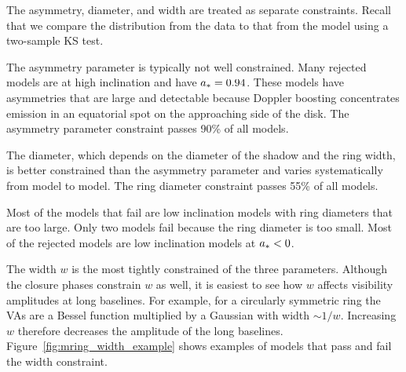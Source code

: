 The \mring asymmetry, diameter, and width are treated as separate constraints.
Recall that we compare the distribution from the data to that from the model using a two-sample KS test.

The asymmetry parameter is typically not well constrained.
Many rejected models are at high inclination and have $a_* =0.94$.
These models have asymmetries that are large and detectable because Doppler boosting concentrates emission in an equatorial spot on the approaching side of the disk.
The asymmetry parameter constraint passes 90\% of all models.

The \mring diameter, which depends on the diameter of the shadow and the ring width, is better constrained than the asymmetry parameter and varies systematically from model to model.  %
The ring diameter constraint passes 55\% of all models.

Most of the models that fail are low inclination models with ring diameters that are too large. Only two \bhac models fail because the ring diameter is too small.  Most of the rejected models are low inclination models at $a_* < 0$.


The \mring width $w$ is the most tightly constrained of the three \mring parameters.
Although the closure phases constrain $w$ as well, it is easiest to see how $w$ affects visibility amplitudes at long baselines.
For example, for a circularly symmetric ring the VAs are a Bessel function multiplied by a Gaussian with width $\sim 1/w$.  Increasing $w$ therefore decreases the amplitude of the long baselines.
Figure~\ref{fig:mring_width_example} shows examples of models that pass and fail the \mring width constraint.

